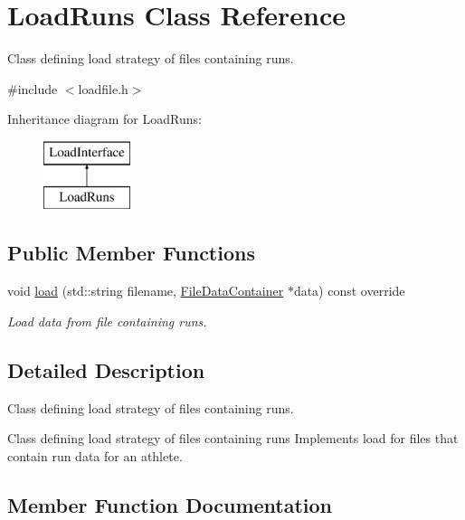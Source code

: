 \hypertarget{classLoadRuns}{}\section{Load\+Runs Class Reference}
\label{classLoadRuns}


Class defining load strategy of files containing runs.  




{\ttfamily \#include $<$loadfile.\+h$>$}

Inheritance diagram for Load\+Runs\+:\begin{figure}[H]
\begin{center}
\leavevmode
\includegraphics[height=2.000000cm]{classLoadRuns}
\end{center}
\end{figure}
\subsection*{Public Member Functions}
\begin{DoxyCompactItemize}
\item 
void \mbox{\hyperlink{classLoadRuns_ad02c65a93f4be99d420ad04a8eeb1a3c}{load}} (std\+::string filename, \mbox{\hyperlink{classFileDataContainer}{File\+Data\+Container}} $\ast$data) const override
\begin{DoxyCompactList}\small\item\em Load data from file containing runs. \end{DoxyCompactList}\end{DoxyCompactItemize}


\subsection{Detailed Description}
Class defining load strategy of files containing runs. 

Class defining load strategy of files containing runs Implements load for files that contain run data for an athlete. 

\subsection{Member Function Documentation}
\mbox{\label{classLoadRuns_ad02c65a93f4be99d420ad04a8eeb1a3c}} 
